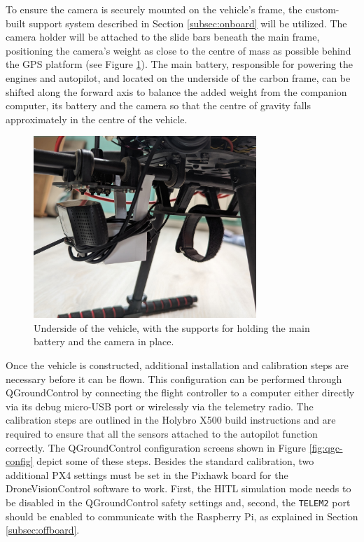 To ensure the camera is securely mounted on the vehicle's frame, the custom-built support system described in Section \ref{subsec:onboard} will be utilized. The camera holder will be attached to the slide bars beneath the main frame, positioning the camera's weight as close to the centre of mass as possible behind the GPS platform (see Figure \ref{fig:camera-holder-closeup}). The main battery, responsible for powering the engines and autopilot, and located on the underside of the carbon frame, can be shifted along the forward axis to balance the added weight from the companion computer, its battery and the camera so that the centre of gravity falls approximately in the centre of the vehicle.

\begin{figure}[H]
  \centering
  \includegraphics[width=0.75\textwidth, keepaspectratio]{img/underside-2.jpg}
  \caption{Underside of the vehicle, with the supports for holding the main battery and the camera in place.}
  \label{fig:camera-holder-closeup}
\end{figure}


Once the vehicle is constructed, additional installation and calibration steps are necessary before it can be flown. This configuration can be performed through QGroundControl by connecting the flight controller to a computer either directly via its debug micro-USB port or wirelessly via the telemetry radio.
The calibration steps are outlined in the Holybro X500 build instructions and are required to ensure that all the sensors attached to the autopilot function correctly. The QGroundControl configuration screens shown in Figure \ref{fig:qgc-config} depict some of these steps. Besides the standard calibration, two additional PX4 settings must be set in the Pixhawk board for the DroneVisionControl software to work. First, the HITL simulation mode needs to be disabled in the QGroundControl safety settings and, second, the \texttt{TELEM2} port should be enabled to communicate with the Raspberry Pi, as explained in Section \ref{subsec:offboard}.


